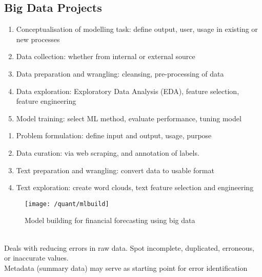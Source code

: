 \subsection{Big Data Projects}

\begin{remark} 
\begin{enumerate}[label=\roman*.]
\setlength{\itemsep}{0pt}
\item Conceptualisation of modelling task: define output, user, usage in existing or new processes
\item Data collection: whether from internal or external source
\item Data preparation and wrangling: cleansing, pre-processing of data
\item Data exploration: Exploratory Data Analysis (EDA), feature selection, feature engineering
\item Model training: select ML method, evaluate performance, tuning model
\end{enumerate}
\end{remark}

\begin{remark} 
\begin{enumerate}[label=\roman*.]
\setlength{\itemsep}{0pt}
\item Problem formulation: define input and output, usage, purpose
\item Data curation: via web scraping, and annotation of labels.
\item Text preparation and wrangling: convert data to usable format
\item Text exploration: create word clouds, text feature selection and engineering
\end{enumerate}
\end{remark}

\begin{figure}[H]
\centering
\texttt{[image: /quant/mlbuild]}
\caption{Model building for financial forecasting using big data}
\end{figure}

\begin{definition} \\
Deals with reducing errors in raw data. Spot incomplete, duplicated, erroneous, or inaccurate values.\\
Metadata (summary data) may serve as starting point for error identification
\end{definition}

